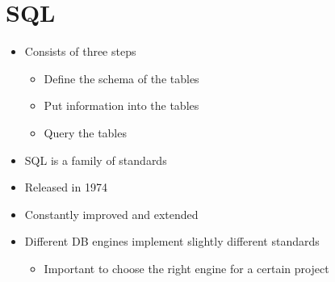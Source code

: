 
\section{SQL}
\begin{itemize}
    \item Consists of three steps
        \begin{itemize}
            \item Define the schema of the tables
            \item Put information into the tables
            \item Query the tables
        \end{itemize}
    \item SQL is a family of standards
        \begin{itemize}
        \end{itemize}
    \item Released in 1974
    \item Constantly improved and extended
    \item Different DB engines implement slightly different standards
        \begin{itemize}
            \item Important to choose the right engine for a certain project
        \end{itemize}
\end{itemize}

